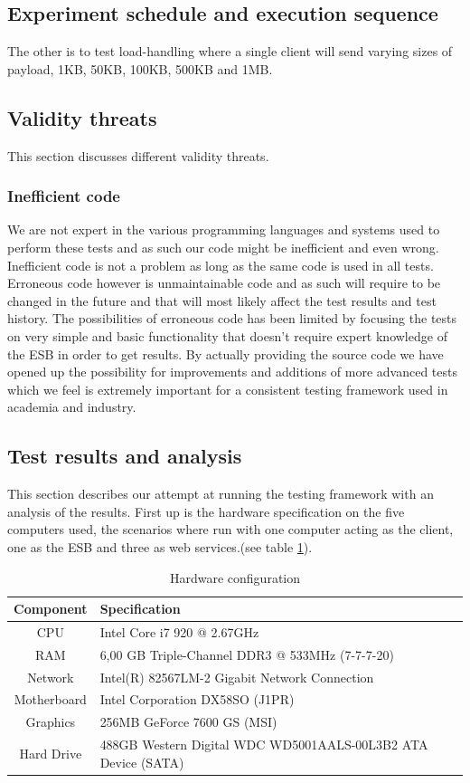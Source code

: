 \subsection{Experiment schedule and execution sequence}
The other is to test load-handling where a single client will send varying sizes of payload, 1KB, 50KB, 100KB, 500KB and 1MB.
\subsection{Validity threats}
This section discusses different validity threats.
\subsubsection{Inefficient code}
We are not expert in the various programming languages and systems used to perform these tests and as such our code might be inefficient and even wrong. Inefficient code is not a problem as long as the same code is used in all tests. Erroneous code however is unmaintainable code and as such will require to be changed in the future and that will most likely affect the test results and test history. 
The possibilities of erroneous code has been limited by focusing the tests on very simple and basic functionality that doesn't require expert knowledge of the ESB in order to get results.
By actually providing the source code we have opened up the possibility for improvements and additions of more advanced tests which we feel is extremely important for a consistent testing framework used in academia and industry.

\subsection{Test results and analysis}
\label{sec:test_results_and_analysis}

This section describes our attempt at running the testing framework with an analysis of the results.
First up is the hardware specification on the five computers used, the scenarios where run with one computer acting as the client, one as the ESB and three as web services.(see table \ref{table:hw-spec}). 

\begin{table}[H]
	\caption{Hardware configuration}
	\label{table:hw-spec}
	\begin{tabular}{c l}
		Component & Specification \\ 
		\hline
		CPU & Intel Core i7 920 @ 2.67GHz  \\
		RAM &  6,00 GB Triple-Channel DDR3 @ 533MHz (7-7-7-20) \\
		Network &  Intel(R) 82567LM-2 Gigabit Network Connection \\
		Motherboard &  Intel Corporation DX58SO (J1PR) \\
		Graphics &  256MB GeForce 7600 GS (MSI) \\
		Hard Drive &  488GB Western Digital WDC WD5001AALS-00L3B2 ATA Device (SATA) \\
		\hline
	\end{tabular} 
\end{table}

